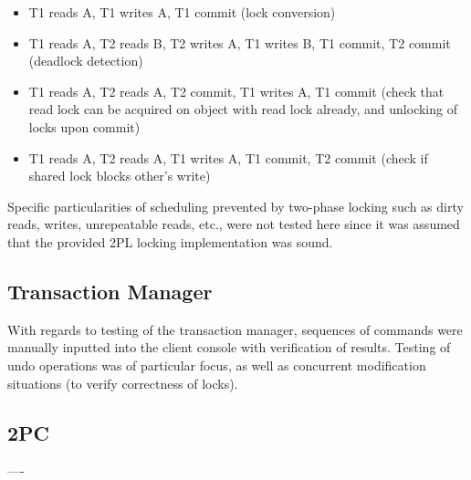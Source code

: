 \documentclass[11pt]{article}
\begin{document}
\begin{itemize}
\item T1 reads A, T1 writes A, T1 commit (lock conversion)
\item T1 reads A, T2 reads B, T2 writes A, T1 writes B, T1 commit, T2 commit (deadlock detection)
\item T1 reads A, T2 reads A, T2 commit, T1 writes A, T1 commit (check that read lock can be acquired on object with read lock already, and unlocking of locks upon commit)
\item T1 reads A, T2 reads A, T1 writes A, T1 commit, T2 commit (check if shared lock blocks other's write)
\end{itemize}

Specific particularities of scheduling prevented by two-phase locking such as dirty reads, writes, unrepeatable reads, etc., were not tested here since it was assumed that the provided 2PL locking implementation was sound. \par

\subsection*{Transaction Manager}

With regards to testing of the transaction manager, sequences of commands were manually inputted into the client console with verification of results. Testing of undo operations was of particular focus, as well as concurrent modification situations (to verify correctness of locks).\par

\subsection*{2PC}

----
\end{document}

